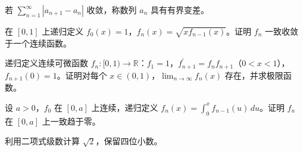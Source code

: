 \noindent\begin{minipage}{\textwidth}
若 $\sum_{n=1}^{\infty}|a_{n+1}-a_n|$ 收敛，称数列 $a_n$ 具有有界变差。
\end{minipage}\par\vfill
\noindent\begin{minipage}{\textwidth}
在 $[0,1]$ 上递归定义 $f_0(x)=1$，$f_n(x)=\sqrt{x f_{n-1}(x)}$。证明 $f_n$ 一致收敛于一个连续函数。
\end{minipage}\par\vfill
\noindent\begin{minipage}{\textwidth}
递归定义连续可微函数 $f_n:[0,1)\to\mathbb R$：$f_1=1$，$f_{n+1}^{\prime}=f_nf_{n+1}$（$0<x<1$），$f_{n+1}(0)=1$。证明对每个 $x\in(0,1)$，$\lim_{n\to\infty}f_n(x)$ 存在，并求极限函数。
\end{minipage}\par\vfill
\newpage
\noindent\begin{minipage}{\textwidth}
设 $a>0$，$f_0$ 在 $[0,a]$ 上连续，递归定义 $f_n(x)=\int_0^x f_{n-1}(u)\,du$。证明 $f_n$ 在 $[0,a]$ 上一致趋于零。
\end{minipage}\par\vfill
\noindent\begin{minipage}{\textwidth}
利用二项式级数计算 $\sqrt2$，保留四位小数。
\end{minipage}\par\vfill
